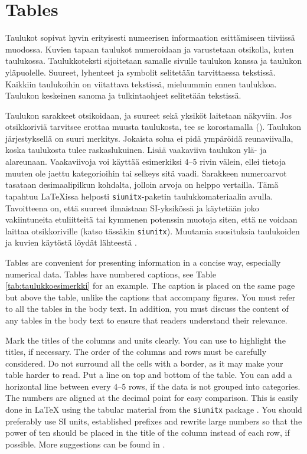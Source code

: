 \section{Tables}

Taulukot sopivat hyvin erityisesti numeerisen informaation esittämiseen tiiviissä muodossa. Kuvien tapaan taulukot numeroidaan ja varustetaan otsikolla, kuten taulukossa. Taulukkoteksti sijoitetaan samalle sivulle taulukon kanssa ja taulukon yläpuolelle. Suureet, lyhenteet ja symbolit selitetään tarvittaessa tekstissä. Kaikkiin taulukoihin on viitattava tekstissä, mieluummin ennen taulukkoa. Taulukon keskeinen sanoma ja tulkintaohjeet selitetään tekstissä.

Taulukon sarakkeet otsikoidaan, ja suureet sekä yksiköt laitetaan näkyviin. Jos otsikkoriviä tarvitsee erottaa muusta taulukosta, tee se korostamalla (). Taulukon järjestyksellä on suuri merkitys. Jokaista solua ei pidä ympäröidä reunaviivalla, koska taulukosta tulee raskaslukuinen. Lisää vaakaviiva taulukon ylä- ja alareunaan. Vaakaviivoja voi käyttää esimerkiksi 4--5 rivin välein, ellei tietoja muuten ole jaettu kategorioihin tai selkeys sitä vaadi. Sarakkeen numeroarvot tasataan desimaalipilkun kohdalta, jolloin arvoja on helppo vertailla. Tämä tapahtuu \LaTeX{}issa helposti \texttt{siunitx}-paketin \parencite{siunitx} taulukkomateriaalin avulla. Tavoitteena on, että suureet ilmaistaan SI-yksikössä ja käytetään joko vakiintuneita etuliitteitä tai kymmenen potenssin muotoja siten, että ne voidaan laittaa otsikkoriville (katso tässäkin \texttt{siunitx}). Muutamia suosituksia taulukoiden ja kuvien käytöstä löydät lähteestä \parencite{pubadvice2009}.

Tables are convenient for presenting information in a concise way, especially numerical data. Tables have numbered captions, see Table \ref{tab:taulukkoesimerkki} for an example. The caption is placed on the same page but above the table, unlike the captions that accompany figures. You must refer to all the tables in the body text. In addition, you must discuss the content of any tables in the body text to ensure that readers understand their relevance.

Mark the titles of the columns and units clearly. You can use  to highlight the titles, if necessary. The order of the columns and rows must be carefully considered. Do not surround all the cells with a border, as it may make your table harder to read. Put a line on top and bottom of the table. You can add a horizontal line between every 4–5 rows, if the data is not grouped into categories. The numbers are aligned at the decimal point for easy comparison. This is easily done in \LaTeX{} using the tabular material from the \texttt{siunitx} package \parencite{siunitx}. You should preferably use SI units, established prefixes and rewrite large numbers so that the power of ten should be placed in the title of the column instead of each row, if possible. More suggestions can be found in \parencite{pubadvice2009}.

